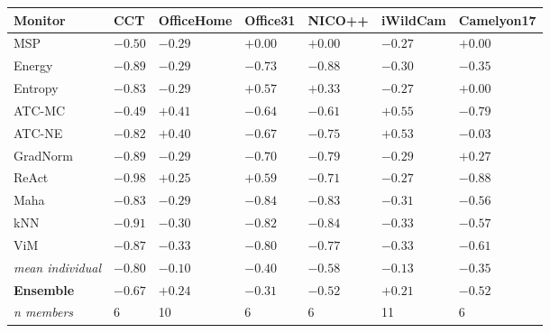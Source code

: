\begin{tabularx}{\linewidth}{l *{6}{Y}}
\toprule
Monitor & CCT & OfficeHome & Office31 & NICO++ & iWildCam & Camelyon17 \\
\midrule
MSP & $-0.50$ & $-0.29$ & $+0.00$ & $+0.00$ & $-0.27$ & $+0.00$ \\
Energy & $-0.89$ & $-0.29$ & $-0.73$ & $-0.88$ & $-0.30$ & $-0.35$ \\
Entropy & $-0.83$ & $-0.29$ & $+0.57$ & $+0.33$ & $-0.27$ & $+0.00$ \\
ATC-MC & $-0.49$ & $+0.41$ & $-0.64$ & $-0.61$ & $+0.55$ & $-0.79$ \\
ATC-NE & $-0.82$ & $+0.40$ & $-0.67$ & $-0.75$ & $+0.53$ & $-0.03$ \\
GradNorm & $-0.89$ & $-0.29$ & $-0.70$ & $-0.79$ & $-0.29$ & $+0.27$ \\
ReAct & $-0.98$ & $+0.25$ & $+0.59$ & $-0.71$ & $-0.27$ & $-0.88$ \\
Maha & $-0.83$ & $-0.29$ & $-0.84$ & $-0.83$ & $-0.31$ & $-0.56$ \\
kNN & $-0.91$ & $-0.30$ & $-0.82$ & $-0.84$ & $-0.33$ & $-0.57$ \\
ViM & $-0.87$ & $-0.33$ & $-0.80$ & $-0.77$ & $-0.33$ & $-0.61$ \\
\midrule
\emph{mean individual} & $-0.80$ & $-0.10$ & $-0.40$ & $-0.58$ & $-0.13$ & $-0.35$ \\
\textbf{Ensemble} & $\mathbf{-0.67}$ & $\mathbf{+0.24}$ & $\mathbf{-0.31}$ & $\mathbf{-0.52}$ & $\mathbf{+0.21}$ & $\mathbf{-0.52}$ \\
\quad\emph{\footnotesize n members} & {\footnotesize 6} & {\footnotesize 10} & {\footnotesize 6} & {\footnotesize 6} & {\footnotesize 11} & {\footnotesize 6} \\
\bottomrule
\end{tabularx}
